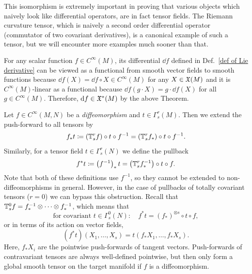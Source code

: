 \begin{rem}
    This isomorphism is extremely important in proving that various objects which naively look like differential operators, are in fact tensor fields. The Riemann curvature tensor, which is naively a second order differential operator (commutator of two covariant derivatives), is a canonical example of such a tensor, but we will encounter more examples much sooner than that.
\end{rem}


\begin{example}[$\dd f$ is a $1$-form]\label{df is a 1-form}
    For any scalar function $f\in C^\infty(M)$, its differential $\dd f$ defined in Def.\ \eqref{def of Lie derivative} can be viewed as a functional from smooth vector fields to smooth functions because $\dd f(X)=\dd f\circ X\in C^\infty(M)$ for any $X\in\mathfrak{X}(M)$ and it is $C^\infty(M)$-linear as a functional because $\dd f(g\cdot X)=g\cdot \dd f(X)$ for all $g\in C^\infty(M)$. Therefore, ${\mathrm{d}} f\in \mathfrak{X}^\ast(M)$ by the above Theorem.
\end{example}

\begin{defn}
    Let $f\in C^\infty(M,N)$ be a \emph{diffeomorphism} and $t\in \Gamma^r_s(M)$. Then we extend the push-forward to all tensors by
    \[
    f_\ast t\coloneqq (\mathbb{T}^r_sf)\circ t\circ f^{-1}=(\mathbb{T}^r_s f_\ast)\circ t\circ f^{-1}.\label{eq pushforward formula}
    \]
    Similarly, for a tensor field $t\in \Gamma^r_s(N)$ we define the pullback
    \[
    f^\ast t\coloneqq \left(f^{-1}\right)_\ast t=\left(\mathbb{T}^r_s f^{-1}_\ast\right)\circ t\circ f.\label{eq pullback formula}
    \]
    Note that both of these definitions use $f^{-1}$, so they cannot be extended to non-diffeomorphisms in general. However, in the case of pullbacks of totally covariant tensors ($r=0$) we can bypass this obstruction. Recall that $\mathbb{T}^0_s f=f_\ast^{-1}\otimes\cdots\otimes f_\ast^{-1}$, which means that
    \[
    \text{for covariant }t\in \Gamma^0_s(N):\quad f^\ast t= (f_\ast)^{\otimes s}\circ t\circ f,
    \]
    or in terms of its action on vector fields,
    \[
    (f^\ast t)(X_1,\ldots,X_s)=t(f_\ast X_1,\ldots,f_\ast X_s).
    \]
    Here, $f_\ast X_i$ are the pointwise push-forwards of tangent vectors. Push-forwards of contravariant tensors are always well-defined pointwise, but then only form a global smooth tensor on the target manifold if $f$ is a diffeomorphism.
\end{defn}

